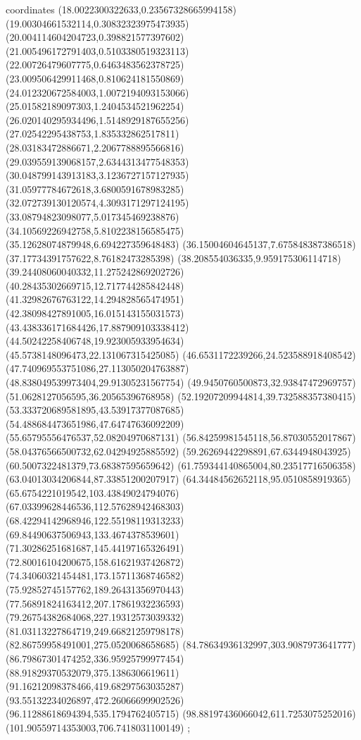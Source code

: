 coordinates {%
(18.0022300322633,0.23567328665994158)
(19.00304661532114,0.30832323975473935)
(20.004114604204723,0.398821577397602)
(21.005496172791403,0.5103380519323113)
(22.00726479607775,0.6463483562378725)
(23.009506429911468,0.810624181550869)
(24.012320672584003,1.0072194093153066)
(25.01582189097303,1.2404534521962254)
(26.020140295934496,1.5148929187655256)
(27.02542295438753,1.835332862517811)
(28.03183472886671,2.2067788895566816)
(29.039559139068157,2.6344313477548353)
(30.048799143913183,3.1236727157127935)
(31.05977784672618,3.6800591678983285)
(32.072739130120574,4.3093171297124195)
(33.08794823098077,5.017345469238876)
(34.10569226942758,5.8102238156585475)
(35.12628074879948,6.694227359648483)
(36.15004604645137,7.675848387386518)
(37.17734391757622,8.76182473285398)
(38.208554036335,9.959175306114718)
(39.24408060040332,11.275242869202726)
(40.28435302669715,12.717744285842448)
(41.32982676763122,14.294828565474951)
(42.38098427891005,16.015143155031573)
(43.438336171684426,17.887909103338412)
(44.50242258406748,19.923005933954634)
(45.5738148096473,22.131067315425085)
(46.6531172239266,24.523588918408542)
(47.740969553751086,27.113050204763887)
(48.838049539973404,29.91305231567754)
(49.9450760500873,32.93847472969757)
(51.0628127056595,36.20565396768958)
(52.19207209944814,39.732588357380415)
(53.333720689581895,43.53917377087685)
(54.488684473651986,47.64747636092209)
(55.65795556476537,52.08204970687131)
(56.84259981545118,56.87030552017867)
(58.04376566500732,62.04294925885592)
(59.26269442298891,67.6344948043925)
(60.5007322481379,73.68387595659642)
(61.759344140865004,80.23517716506358)
(63.04013034206844,87.33851200207917)
(64.34484562652118,95.0510858919365)
(65.6754221019542,103.43849024794076)
(67.03399628446536,112.57628942468303)
(68.42294142968946,122.55198119313233)
(69.84490637506943,133.4674378539601)
(71.30286251681687,145.44197165326491)
(72.80016104200675,158.61621937426872)
(74.34060321454481,173.15711368746582)
(75.92852745157762,189.26431356970443)
(77.56891824163412,207.17861932236593)
(79.26754382684068,227.19312573039332)
(81.03113227864719,249.66821259798178)
(82.86759958491001,275.0520068658685)
(84.78634936132997,303.9087973641777)
(86.79867301474252,336.95925799977454)
(88.91829370532079,375.1386306619611)
(91.16212098378466,419.68297563035287)
(93.55132234026897,472.26066699902526)
(96.11288618694394,535.1794762405715)
(98.88197436066042,611.7253075252016)
(101.90559714353003,706.7418031100149)
};
